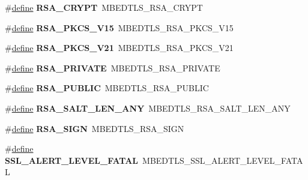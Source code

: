 \begin{DoxyCompactItemize}
\item 
\mbox{\label{compat-1_83_8h_afdeb08b89f455b4c80a8283a1559b97d}} 
\#\hyperlink{structdefine}{define} {\bfseries R\+S\+A\+\_\+\+C\+R\+Y\+PT}~M\+B\+E\+D\+T\+L\+S\+\_\+\+R\+S\+A\+\_\+\+C\+R\+Y\+PT
\item 
\mbox{\label{compat-1_83_8h_acc924b6d08c92a2252fbab6c6ca5860e}} 
\#\hyperlink{structdefine}{define} {\bfseries R\+S\+A\+\_\+\+P\+K\+C\+S\+\_\+\+V15}~M\+B\+E\+D\+T\+L\+S\+\_\+\+R\+S\+A\+\_\+\+P\+K\+C\+S\+\_\+\+V15
\item 
\mbox{\label{compat-1_83_8h_ade2521c3c28b0f5b222fdef75f9f87e9}} 
\#\hyperlink{structdefine}{define} {\bfseries R\+S\+A\+\_\+\+P\+K\+C\+S\+\_\+\+V21}~M\+B\+E\+D\+T\+L\+S\+\_\+\+R\+S\+A\+\_\+\+P\+K\+C\+S\+\_\+\+V21
\item 
\mbox{\label{compat-1_83_8h_aeaabdd3bae85e564beb1ae9843169eb9}} 
\#\hyperlink{structdefine}{define} {\bfseries R\+S\+A\+\_\+\+P\+R\+I\+V\+A\+TE}~M\+B\+E\+D\+T\+L\+S\+\_\+\+R\+S\+A\+\_\+\+P\+R\+I\+V\+A\+TE
\item 
\mbox{\label{compat-1_83_8h_a1f00bab389d3db27a115db74e32be727}} 
\#\hyperlink{structdefine}{define} {\bfseries R\+S\+A\+\_\+\+P\+U\+B\+L\+IC}~M\+B\+E\+D\+T\+L\+S\+\_\+\+R\+S\+A\+\_\+\+P\+U\+B\+L\+IC
\item 
\mbox{\label{compat-1_83_8h_a6361445cef26eba64992ea54ecb90a47}} 
\#\hyperlink{structdefine}{define} {\bfseries R\+S\+A\+\_\+\+S\+A\+L\+T\+\_\+\+L\+E\+N\+\_\+\+A\+NY}~M\+B\+E\+D\+T\+L\+S\+\_\+\+R\+S\+A\+\_\+\+S\+A\+L\+T\+\_\+\+L\+E\+N\+\_\+\+A\+NY
\item 
\mbox{\label{compat-1_83_8h_ae1bbc14f00a5c873d7770b44c412df1d}} 
\#\hyperlink{structdefine}{define} {\bfseries R\+S\+A\+\_\+\+S\+I\+GN}~M\+B\+E\+D\+T\+L\+S\+\_\+\+R\+S\+A\+\_\+\+S\+I\+GN
\item 
\mbox{\label{compat-1_83_8h_a7aada6071810eba54885ae8ba9012a14}} 
\#\hyperlink{structdefine}{define} {\bfseries S\+S\+L\+\_\+\+A\+L\+E\+R\+T\+\_\+\+L\+E\+V\+E\+L\+\_\+\+F\+A\+T\+AL}~M\+B\+E\+D\+T\+L\+S\+\_\+\+S\+S\+L\+\_\+\+A\+L\+E\+R\+T\+\_\+\+L\+E\+V\+E\+L\+\_\+\+F\+A\+T\+AL

\end{DoxyCompactItemize}
